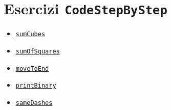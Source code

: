\documentclass{article}
\begin{document}
\section*{Esercizi \texttt{CodeStepByStep}}
\begin{itemize}
	\item \href{https://www.codestepbystep.com/problem/view/cpp/algorithms/sumCubes}{\texttt{sumCubes}}
	\item \href{https://codestepbystep.com/problem/view/cpp/recursion/sumOfSquares}{\texttt{sumOfSquares}}
	\item \href{https://codestepbystep.com/problem/view/cpp/recursion/moveToEnd}{\texttt{moveToEnd}}
	\item \href{https://codestepbystep.com/problem/view/cpp/recursion/printBinary}{\texttt{printBinary}}
	\item \href{https://codestepbystep.com/problem/view/cpp/strings/sameDashes}{\texttt{sameDashes}}
\end{itemize}
\end{document}
